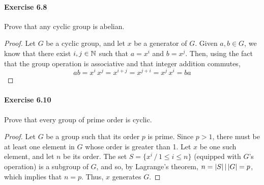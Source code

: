 \paragraph{Exercise 6.8}
Prove that any cyclic group is abelian.

\begin{proof}
Let $G$ be a cyclic group, and let $x$ be a generator of $G$. Given 
$a, b \in G$, we know that there exist $i, j \in \mathbb{N}$ such that
$a = x^i$ and $b = x^j$. Then, using the fact that the group 
operation is associative and that integer addition commutes,
$$ab = x^i \, x^j = x^{i+j} = x^{j+i} = x^j \, x^i = ba$$
\end{proof}


\paragraph{Exercise 6.10}
Prove that every group of prime order is cyclic.

\begin{proof}
Let $G$ be a group such that its order $p$ is prime. Since $p > 1$, 
there must be at least one element in $G$ whose order is greater than 1.
Let $x$ be one such element, and let $n$ be its order. The set 
$S = \{x^i \, / \, 1 \leq i \leq n \}$ (equipped with $G$'s operation)
is a subgroup of $G$, and so, by Lagrange's theorem,
$n = |S| \, | \, |G| = p$, which implies that $n = p$. Thus, $x$ 
generates $G$.
\end{proof}
